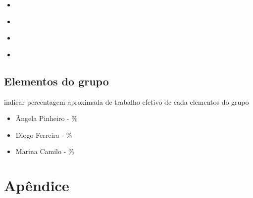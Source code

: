 \documentclass[12pt]{report}
\begin{document}
\begin{itemize}
	\item \href{http://jade.tilab.com}{\jade}
	\item \href{http://repast.sourceforge.net/repast_3/index.html}{\repast}
	\item \href{https://web.fe.up.pt/~hlc/doku.php?id=sajas}{\sajas}
	\item \href{https://web.fe.up.pt/~hlc/doku.php?id=massim2dev}{\massim}
\end{itemize}

\section{Elementos do grupo}
indicar percentagem aproximada de trabalho efetivo de cada elementos do grupo
\begin{itemize}
	\item Ângela Pinheiro - \%
	\item Diogo Ferreira - \%
	\item Marina Camilo - \%
\end{itemize}

\chapter{Apêndice}
\end{document}
